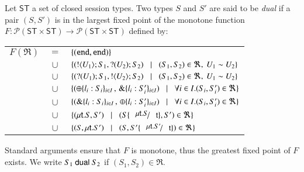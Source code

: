 \begin{definition}[Duality]
	\label{def:dual}
	Let $\mathsf{ST}$ a set of closed session types. 
	Two types $S$ and $S'$ are said to be {\em dual} if a pair $(S,S')$ is 
	in the largest fixed point of the monotone function
	$F:\mathcal{P}(\mathsf{ST}\times \mathsf{ST}) \to 
	\mathcal{P}(\mathsf{ST}\times \mathsf{ST})$ defined by:
	\\[1mm]
%
	\begin{tabular}{rcl}
		$F(\Re)$	&$\!\!=\!\!$&	$\{(\mathtt{end}, \mathtt{end})\}$
		\\
				&$\!\!\cup\!\!$&	$\{(! \langle U_1 \rangle ; S_1, ? (U_2) ; S_2)
							\;\;\;|\;\;\;(S_1, S_2)\in \Re, \  U_1 \sim U_2 \}$
		\\ 
				&$\!\!\cup\!\!$&	$\{(? (U_1) ; S_1, ! \langle U_2 \rangle ; S_2)
							\;\;\;|\;\;\;(S_1, S_2)\in \Re, \ U_1 \sim U_2\}$
		\\ 
				&$\!\!\cup\!\!$&	$\{(\oplus \{l_i: S_i\}_{i \in I} \,,\, \& \{l_i: S_i'\}_{i \in I}) \;\;\;|\;\;\; \forall i\in I. (S_i, S_i')\in \Re\}$
		\\
				&$\!\!\cup\!\!$&	$\{(\& \{l_i: S_i\}_{i \in I}\,,\, \oplus \{l_i: S_i'\}_{i \in I}) \;\;\;|\;\;\; \forall i\in I. (S_i, S_i')\in \Re\}$
		\\
				&$\!\!\cup\!\!$&	$\set{(\trec{t}{S}, S') \bnfbar (S\subst{\trec{t}{S}}{\vart{t}},S')\in \Re}$
		\\
				&$\!\!\cup\!\!$&	$\set{(S,\trec{t}{S'}) \bnfbar (S,S'\subst{\trec{t}{S'}}{\vart{t}})\in \Re}$
		\\[1mm]
	\end{tabular}
	\noindent
	Standard arguments ensure that $F$ is monotone, thus the greatest fixed point
	of $F$ exists. We write $S_1 \ \mathsf{dual}\  S_2$ if  $(S_1,S_2)\in \Re$. 
\end{definition}


\smallskip 

